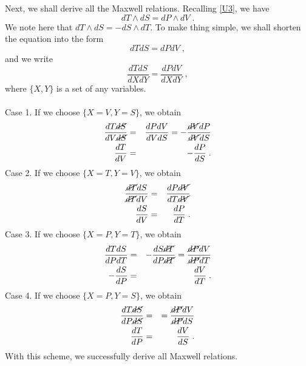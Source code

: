 \documentclass[12pt]{article}
\numberwithin{equation}{section}
\theoremstyle{remark}
\theoremstyle{definition}
\newcommand{\nn}{\nonumber}
\begin{document}
\\
\\
Next, we shall derive all the Maxwell relations. Recalling \eqref{U3}, we have 
\begin{equation}
    dT\wedge dS=dP\wedge dV\;.
\end{equation}
We note here that $dT\wedge dS=-dS\wedge dT$. To make thing simple, we shall shorten the equation into the form
\begin{equation}
    dTdS=dPdV\;,
\end{equation}
and we write
\begin{equation}
    \frac{dTdS}{dXdY}=\frac{dPdV}{dXdY}\;,
\end{equation}
where $\{X,Y\}$ is a set of any variables.
\\
\\
Case 1. If we choose $\{X=V,Y=S\}$, we obtain
\begin{eqnarray}\label{MW1}
    \frac{dT\cancel{dS}}{dV\cancel{dS}}&=&\frac{dPdV}{dVdS}=-\frac{\cancel{dV}dP}{\cancel{dV}dS}\nn\\
    \frac{dT}{dV}&=&-\frac{dP}{dS}\;.
\end{eqnarray}
Case 2. If we choose $\{X=T,Y=V\}$, we obtain
\begin{eqnarray}\label{MW2}
    \frac{\cancel{dT}dS}{\cancel{dT}dV}&=&\frac{dP\cancel{dV}}{dT\cancel{dV}}\nn\\
    \frac{dS}{dV}&=&\frac{dP}{dT}\;.
\end{eqnarray}
Case 3. If we choose $\{X=P,Y=T\}$, we obtain
\begin{eqnarray}\label{MW3}
    \frac{dTdS}{dPdT}&=&-\frac{dS\cancel{dT}}{dP\cancel{dT}}=\frac{\cancel{dP}dV}{\cancel{dP}dT}\nn\\
    -\frac{dS}{dP}&=&\frac{dV}{dT}\;.
\end{eqnarray}
Case 4. If we choose $\{X=P,Y=S\}$, we obtain
\begin{eqnarray}\label{MW4}
    \frac{dT\cancel{dS}}{dP\cancel{dS}}&=&=\frac{\cancel{dP}dV}{\cancel{dP}dS}\nn\\
    \frac{dT}{dP}&=&\frac{dV}{dS}\;.
\end{eqnarray}
With this scheme, we successfully derive all Maxwell relations.
%
%
%
\end{document}
